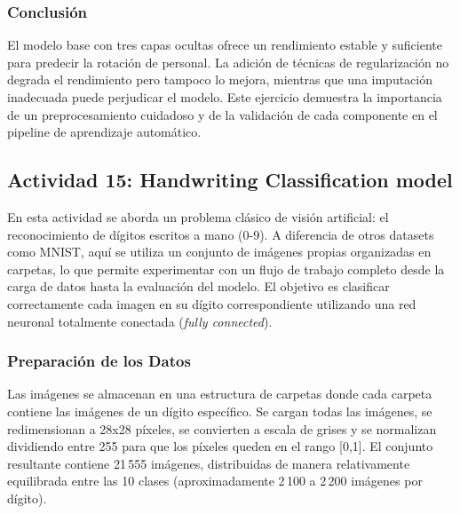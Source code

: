 \documentclass[12pt]{article}
\begin{document}
\subsubsection*{Conclusión}

El modelo base con tres capas ocultas ofrece un rendimiento estable y suficiente para predecir la rotación de personal. La adición de técnicas de regularización no degrada el rendimiento pero tampoco lo mejora, mientras que una imputación inadecuada puede perjudicar el modelo. Este ejercicio demuestra la importancia de un preprocesamiento cuidadoso y de la validación de cada componente en el pipeline de aprendizaje automático.

\subsection{Actividad 15: Handwriting Classification model}

En esta actividad se aborda un problema clásico de visión artificial: el reconocimiento de dígitos escritos a mano (0-9). A diferencia de otros datasets como MNIST, aquí se utiliza un conjunto de imágenes propias organizadas en carpetas, lo que permite experimentar con un flujo de trabajo completo desde la carga de datos hasta la evaluación del modelo. El objetivo es clasificar correctamente cada imagen en su dígito correspondiente utilizando una red neuronal totalmente conectada (\textit{fully connected}).

\subsubsection*{Preparación de los Datos}

Las imágenes se almacenan en una estructura de carpetas donde cada carpeta contiene las imágenes de un dígito específico. Se cargan todas las imágenes, se redimensionan a 28x28 píxeles, se convierten a escala de grises y se normalizan dividiendo entre 255 para que los píxeles queden en el rango [0,1]. El conjunto resultante contiene 21\,555 imágenes, distribuidas de manera relativamente equilibrada entre las 10 clases (aproximadamente 2\,100 a 2\,200 imágenes por dígito).
\end{document}
